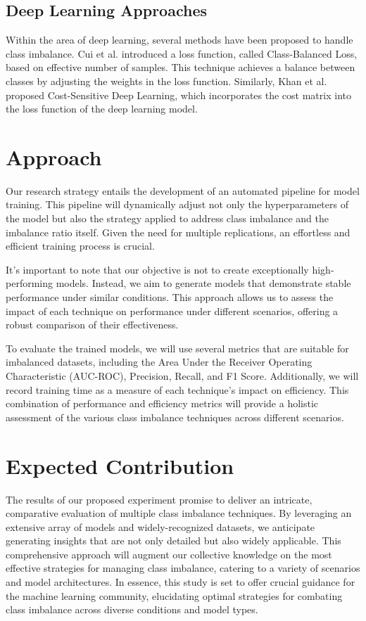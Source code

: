 \documentclass[journal]{IEEEtran}
\begin{document}
		\subsection{Deep Learning Approaches}
		Within the area of deep learning, several methods have been proposed to handle class imbalance. Cui et al. \cite{cui2019} introduced a loss function, called Class-Balanced Loss, based on effective number of samples. This technique achieves a balance between classes by adjusting the weights in the loss function. Similarly, Khan et al. \cite{khan2017} proposed Cost-Sensitive Deep Learning, which incorporates the cost matrix into the loss function of the deep learning model.	
		
	
	\section{Approach}

		Our research strategy entails the development of an automated pipeline for model training. This pipeline will dynamically adjust not only the hyperparameters of the model but also the strategy applied to address class imbalance and the imbalance ratio itself. Given the need for multiple replications, an effortless and efficient training process is crucial.
		
		It's important to note that our objective is not to create exceptionally high-performing models. Instead, we aim to generate models that demonstrate stable performance under similar conditions. This approach allows us to assess the impact of each technique on performance under different scenarios, offering a robust comparison of their effectiveness.
		
		To evaluate the trained models, we will use several metrics that are suitable for imbalanced datasets, including the Area Under the Receiver Operating Characteristic (AUC-ROC), Precision, Recall, and F1 Score. Additionally, we will record training time as a measure of each technique's impact on efficiency. This combination of performance and efficiency metrics will provide a holistic assessment of the various class imbalance techniques across different scenarios.


	\section{Expected Contribution}
	
		The results of our proposed experiment promise to deliver an intricate, comparative evaluation of multiple class imbalance techniques. By leveraging an extensive array of models and widely-recognized datasets, we anticipate generating insights that are not only detailed but also widely applicable. This comprehensive approach will augment our collective knowledge on the most effective strategies for managing class imbalance, catering to a variety of scenarios and model architectures. In essence, this study is set to offer crucial guidance for the machine learning community, elucidating optimal strategies for combating class imbalance across diverse conditions and model types.
		
		
	\label{sec:references}
	
	
	
\end{document}
